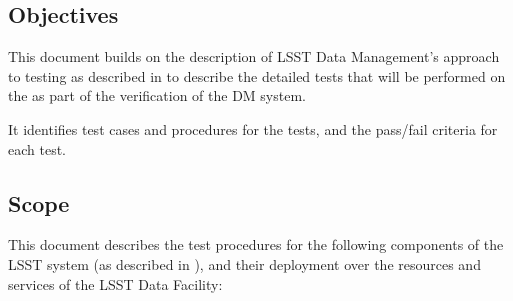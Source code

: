 \documentclass[DM,STS,toc]{lsstdoc}
\begin{document}
\subsection{Objectives}
\label{sec:objectives}

This document builds on the description of LSST Data Management's approach to testing as described in  to describe the detailed tests that will be performed on the \product{} as part of the verification of the DM system.

It identifies test cases and procedures for the tests, and the pass/fail criteria for each test.

\subsection{Scope}
\label{sec:scope}

This document describes the test procedures for the following components of the LSST system (as described in ), and their deployment over the resources and services of the LSST Data Facility:
\end{document}
